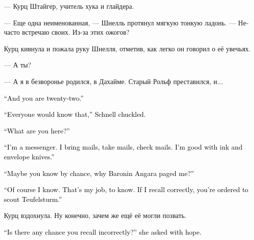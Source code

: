 \documentclass[a4paper,12pt,fleqn]{book}\usepackage{cooltooltips}\usepackage{polyglossia}\setdefaultlanguage[babelshorthands=true]{russian}\setotherlanguage{english}\defaultfontfeatures{Ligatures=TeX,Mapping=tex-text} \usepackage{xcolor}\definecolor{lightgray}{HTML}{bbbbbb}\color{lightgray}\newcommand{\ml}[3]{\textenglish{\textcolor{black}{#3}}}
\begin{document}
--- Курц Штайгер, учитель хука и глайдера.

--- Еще одна неименованная, --- Шнелль протянул мягкую тонкую ладонь.
--- Нечасто встречаю своих.
Из-за этих ожогов?

Курц кивнула и пожала руку Шнелля, отметив, как легко он говорил о её увечьях.

--- А ты?

--- А я в безворонье родился, в Дахайме.
Старый Рольф преставился, и...

\ml{$0$}
{--- И тебе двадцать два года.}
{``And you are twenty-two.''}

\ml{$0$}
{--- Все всегда угадывают мой возраст, --- хихикнул Шнелль.}
{``Everyone would know that,'' Schnell chuckled.}

\ml{$0$}
{--- Кем ты здесь работаешь?}
{``What are you here?''}

\ml{$0$}
{--- Я гонец.}
{``I'm a messenger.}
\ml{$0$}
{Почту приношу, уношу, проверяю.}
{I bring mails, take mails, check mails.}
\ml{$0$}
{Хорошо обращаюсь с чернилами и ножом для конвертов.}
{I'm good with ink and envelope knives.''}

\ml{$0$}
{--- Может быть, ты случайно знаешь, зачем баронин Ангара меня вызвала?}
{``Maybe you know by chance, why Baronin Angara paged me?''}

\ml{$0$}
{--- Знаю, конечно.}
{``Of course I know.}
\ml{$0$}
{Профессия у меня такая --- знать.}
{That's my job, to know.}
\ml{$0$}
{Если мне не изменяет память, тебя отправляют на разведку к Тойфельстурм.}
{If I recall correctly, you're ordered to scout Teufelsturm.''}

Курц вздохнула.
Ну конечно, зачем же ещё её могли позвать.

\ml{$0$}
{--- А если память тебе изменяет? --- с надеждой спросила она.}
{``Is there any chance you recall incorrectly?'' she asked with hope.}
\end{document}
